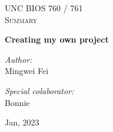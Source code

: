 \begin{titlepage}
\vbox{ }

\vbox{ }

\begin{center}
\textsc{\LARGE UNC BIOS 760 / 761}\\[1.5cm]
\textsc{\Large Summary}\\[0.5cm]

\vbox{ }

{ \huge \bfseries Creating my own project}\\[0.4cm]

\begin{minipage}{0.4\textwidth}
\begin{flushleft} \large
\emph{Author:}\\
Mingwei Fei
\end{flushleft}
\end{minipage}
\begin{minipage}{0.4\textwidth}
\begin{flushright} \large
\emph{Special colaborator:} \\
Bonnie
\end{flushright}
\end{minipage}
\vfill
{\large Jan, 2023}
\end{center}
\end{titlepage}